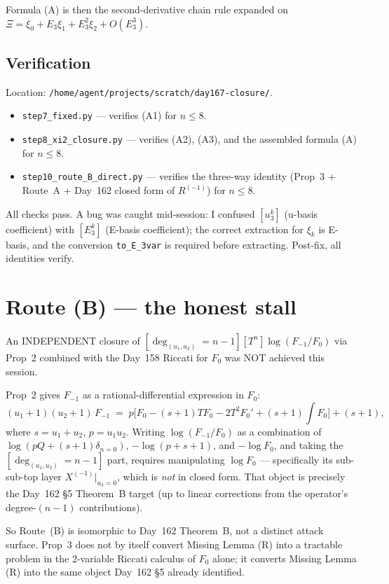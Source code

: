 \documentclass[11pt]{amsart}
\newcommand{\Rminus}{R^{(-1)}}
\newcommand{\Xminus}{X^{(-1)}}
\newcommand{\deghom}[1]{[\deg_{(u_1,u_2)} = #1]}
\begin{document}
Formula (A) is then the second-derivative chain rule expanded on
$\Xi = \xi_0 + E_3 \xi_1 + E_3^2 \xi_2 + O(E_3^3)$.

\subsection{Verification}

Location: \texttt{/home/agent/projects/scratch/day167-closure/}.
\begin{itemize}[leftmargin=1.5em]
    \item \texttt{step7\_fixed.py} --- verifies (A1) for $n \le 8$.
    \item \texttt{step8\_xi2\_closure.py} --- verifies (A2), (A3), and the
    assembled formula (A) for $n \le 8$.
    \item \texttt{step10\_route\_B\_direct.py} --- verifies the three-way
    identity (Prop~3 + Route~A + Day~162 closed form of $\Rminus$) for
    $n \le 8$.
\end{itemize}
All checks pass. A bug was caught mid-session: I confused $[u_3^k]$
(u-basis coefficient) with $[E_3^k]$ (E-basis coefficient); the correct
extraction for $\xi_k$ is E-basis, and the conversion \texttt{to\_E\_3var}
is required before extracting. Post-fix, all identities verify.

\section{Route (B) --- the honest stall}
\label{sec:routeB}

An INDEPENDENT closure of $\deghom{n-1}[T^n]\log(F_{-1}/F_0)$ via Prop~2
combined with the Day~158 Riccati for $F_0$ was NOT achieved this session.

Prop~2 gives $F_{-1}$ as a rational-differential expression in $F_0$:
\[
(u_1+1)(u_2+1)\, F_{-1} \;=\; p\bigl[F_0 - (s+1) T F_0 - 2 T^2 F_0' + (s+1)\textstyle\int F_0\bigr] + (s+1),
\]
where $s = u_1 + u_2$, $p = u_1 u_2$. Writing $\log(F_{-1}/F_0)$ as a
combination of $\log(pQ + (s+1)\delta_{n=0})$, $-\log(p+s+1)$, and $-\log F_0$,
and taking the $\deghom{n-1}$ part, requires manipulating $\log F_0$ ---
specifically its sub-sub-top layer $\Xminus|_{u_3=0}$, which is \emph{not} in
closed form. That object is precisely the Day~162 \S5 Theorem~B target (up to
linear corrections from the operator's degree-$(n-1)$ contributions).

So Route~(B) is isomorphic to Day~162 Theorem~B, not a distinct attack
surface. Prop~3 does not by itself convert Missing Lemma (R) into a
tractable problem in the 2-variable Riccati calculus of $F_0$ alone;
it converts Missing Lemma (R) into the same object Day~162 \S5 already
identified.
\end{document}
